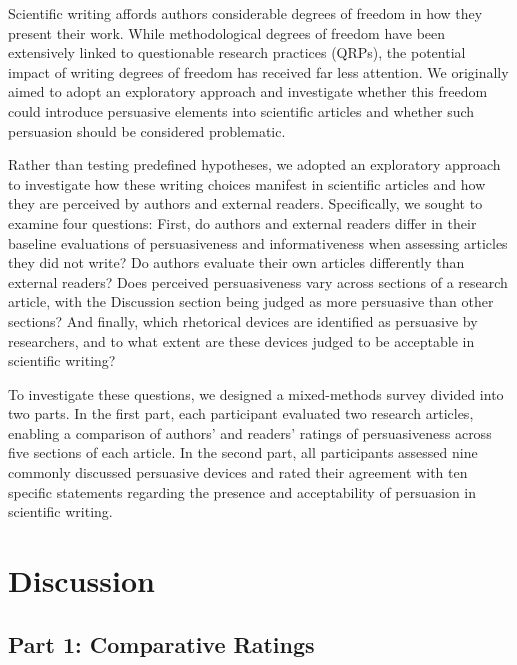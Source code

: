 \documentclass[authordate, meta]{jote-new-article}
\begin{document}
	\begin{originalPurpose}



	Scientific writing affords authors considerable degrees of freedom in how they present their work. While methodological degrees of freedom have been extensively linked to questionable research practices (QRPs), the potential impact of writing degrees of freedom has received far less attention. We originally aimed to adopt an exploratory approach and investigate whether this freedom could introduce persuasive elements into scientific articles and whether such persuasion should be considered problematic.



	Rather than testing predefined hypotheses, we adopted an exploratory approach to investigate how these writing choices manifest in scientific articles and how they are perceived by authors and external readers. Specifically, we sought to examine four questions: First, do authors and external readers differ in their baseline evaluations of persuasiveness and informativeness when assessing articles they did not write? Do authors evaluate their own articles differently than external readers? Does perceived persuasiveness vary across sections of a research article, with the Discussion section being judged as more persuasive than other sections? And finally, which rhetorical devices are identified as persuasive by researchers, and to what extent are these devices judged to be acceptable in scientific writing?



	To investigate these questions, we designed a mixed-methods survey divided into two parts. In the first part, each participant evaluated two research articles, enabling a comparison of authors' and readers' ratings of persuasiveness across five sections of each article. In the second part, all participants assessed nine commonly discussed persuasive devices and rated their agreement with ten specific statements regarding the presence and acceptability of persuasion in scientific writing.

	\end{originalPurpose}

	\section{Discussion}



	\subsection{Part 1: Comparative Ratings}
\end{document}

